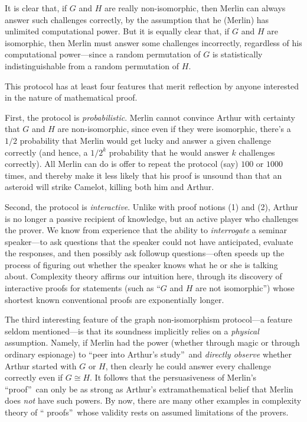 \documentclass[12pt,onecolumn]{article}%
\begin{document}
It is clear that, if $G$ and $H$ are really non-isomorphic, then Merlin can
always answer such challenges correctly, by the assumption that he (Merlin)
has unlimited computational power. But it is equally clear that, if $G$ and
$H$ are isomorphic, then Merlin must answer some challenges incorrectly,
regardless of his computational power---since a random permutation of $G$ is
statistically indistinguishable from a random permutation of $H$.

This protocol has at least four features that merit reflection by anyone
interested in the nature of mathematical proof.

First, the protocol is \textit{probabilistic}. Merlin cannot convince Arthur
with certainty that $G$ and $H$ are non-isomorphic, since even if they were
isomorphic, there's a $1/2$ probability that Merlin would get lucky and
answer a given challenge correctly (and hence, a $1/2^{k}$ probability that
he would answer $k$ challenges correctly). All Merlin can do is offer to
repeat the protocol (say) $100$ or $1000$ times, and thereby make it less
likely that his proof is unsound than that an asteroid will strike Camelot,
killing both him and Arthur.

Second, the protocol is \textit{interactive}. Unlike with proof notions (1)
and (2), Arthur is no longer a passive recipient of knowledge, but an active
player who challenges the prover. We know from experience that the ability
to \textit{interrogate} a seminar speaker---to ask questions that the speaker
could not have anticipated, evaluate the responses, and then possibly ask
followup questions---often speeds up the process of figuring out whether the
speaker knows what he or she is talking about. Complexity theory affirms our
intuition here, through its discovery of interactive proofs for statements
(such as \textquotedblleft$G$ and $H$ are not isomorphic\textquotedblright )
whose shortest known conventional proofs are exponentially longer.

The third interesting feature of the graph non-isomorphism protocol---a
feature seldom mentioned---is that its soundness implicitly relies on a
\textit{physical} assumption. Namely, if Merlin had the power (whether
through magic or through ordinary espionage) to \textquotedblleft peer into
Arthur's study\textquotedblright\  and \textit{directly observe} whether Arthur
started with $G$ or $H$, then clearly he could answer every challenge
correctly even if $G\cong H$. It follows that the persuasiveness of Merlin's
\textquotedblleft proof\textquotedblright\  can only be as strong as Arthur's
extramathematical belief that Merlin does \textit{not} have such powers. By
now, there are many other examples in complexity theory of \textquotedblleft
proofs\textquotedblright\  whose validity rests on assumed limitations of the provers.
\end{document}
